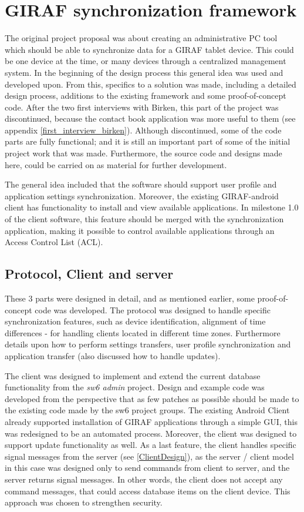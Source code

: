 \section{GIRAF synchronization framework}
The original project proposal was about creating an administrative PC tool which should be able to synchronize data for a GIRAF tablet device. This could be one device at the time, or many devices through a centralized management system. In the beginning of the design process this general idea was used and developed upon. From this, specifics to a solution was made, including a detailed design process, additions to the existing framework and some proof-of-concept code. After the two first interviews with Birken, this part of the project was discontinued, because the contact book application was more useful to them (see appendix \vref{first_interview_birken}). Although discontinued, some of the code parts are fully functional; and it is still an important part of some of the initial project work that was made. Furthermore, the source code and designs made here, could be carried on as material for further development. 

The general idea included that the software should support user profile and application settings synchronization. Moreover, the existing GIRAF-android client has functionality to install and view available applications. In milestone 1.0 of the client software, this feature should be merged with the synchronization application, making it possible to control available applications through an Access Control List (ACL).

\subsection{Protocol, Client and server}
These 3 parts were designed in detail, and as mentioned earlier, some proof-of-concept code was developed. The protocol was designed to handle specific synchronization features, such as device identification, alignment of time differences - for handling clients located in different time zones. Furthermore details upon how to perform settings transfers, user profile synchronization and application transfer (also discussed how to handle updates).  

The client was designed to implement and extend the current database functionality from the \emph{sw6 admin} project. Design and example code was developed from the perspective that as few patches as possible should be made to the existing code made by the sw6 project groups.
The existing Android Client already supported installation of GIRAF applications through a simple GUI, this  was redesigned to be an automated process. Moreover, the client was designed to support update functionality as well. As a last feature, the client handles specific signal messages from the server (see \vref{ClientDesign}), as the server / client model in this case was designed only to send commands from client to server, and the server returns signal messages. In other words, the client does not accept any command messages, that could access database items on the client device. This approach was chosen to strengthen security.  

